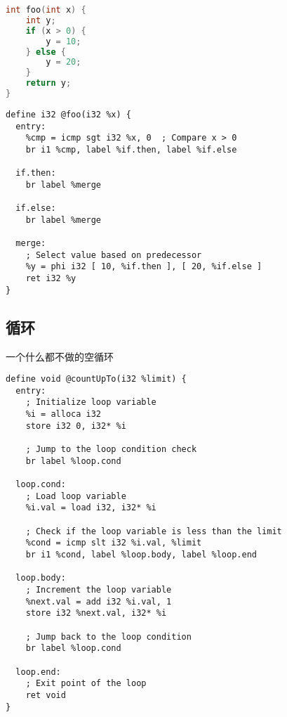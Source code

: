 \begin{lstlisting}[language=cpp]
int foo(int x) {
    int y;
    if (x > 0) {
        y = 10;
    } else {
        y = 20;
    }
    return y;
}
\end{lstlisting}

\begin{lstlisting}[language=none]
define i32 @foo(i32 %x) {
  entry:
    %cmp = icmp sgt i32 %x, 0  ; Compare x > 0
    br i1 %cmp, label %if.then, label %if.else

  if.then:
    br label %merge

  if.else:
    br label %merge

  merge:
    ; Select value based on predecessor
    %y = phi i32 [ 10, %if.then ], [ 20, %if.else ]
    ret i32 %y
}
\end{lstlisting}


\subsection{循环}
一个什么都不做的空循环
\begin{lstlisting}[language=none]
define void @countUpTo(i32 %limit) {
  entry:
    ; Initialize loop variable
    %i = alloca i32
    store i32 0, i32* %i

    ; Jump to the loop condition check
    br label %loop.cond

  loop.cond:
    ; Load loop variable
    %i.val = load i32, i32* %i

    ; Check if the loop variable is less than the limit
    %cond = icmp slt i32 %i.val, %limit
    br i1 %cond, label %loop.body, label %loop.end

  loop.body:
    ; Increment the loop variable
    %next.val = add i32 %i.val, 1
    store i32 %next.val, i32* %i

    ; Jump back to the loop condition
    br label %loop.cond

  loop.end:
    ; Exit point of the loop
    ret void
}
\end{lstlisting}

